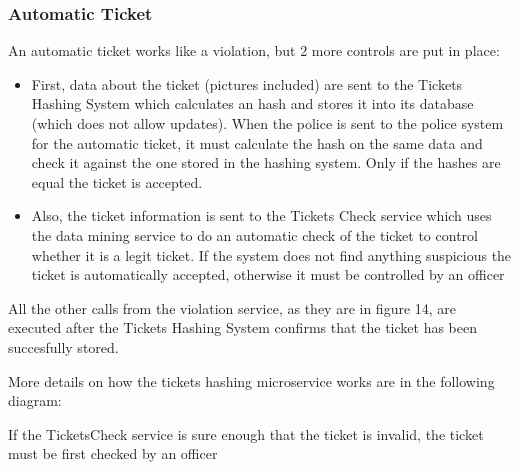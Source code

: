 \subsubsection{Automatic Ticket}
An automatic ticket works like a violation, but 2 more controls are put in place:
\begin{itemize}
    \item First, data about the ticket (pictures included) are sent to the Tickets Hashing System which calculates an hash and stores it into its database (which does not allow updates). When the police is sent to the police system for the automatic ticket, it must calculate the hash on the same data and check it against the one stored in the hashing system. Only if the hashes are equal the ticket is accepted.
    \item Also, the ticket information is sent to the Tickets Check service which uses the data mining service to do an automatic check of the ticket to control whether it is a legit ticket. If the system does not find anything suspicious the ticket is automatically accepted, otherwise it must be controlled by an officer
\end{itemize}
All the other calls from the violation service, as they are in figure 14, are executed after the Tickets Hashing System confirms that the ticket has been succesfully stored.


More details on how the tickets hashing microservice works are in the following diagram:


If the TicketsCheck service is sure enough that the ticket is invalid, the ticket must be first checked by an officer

